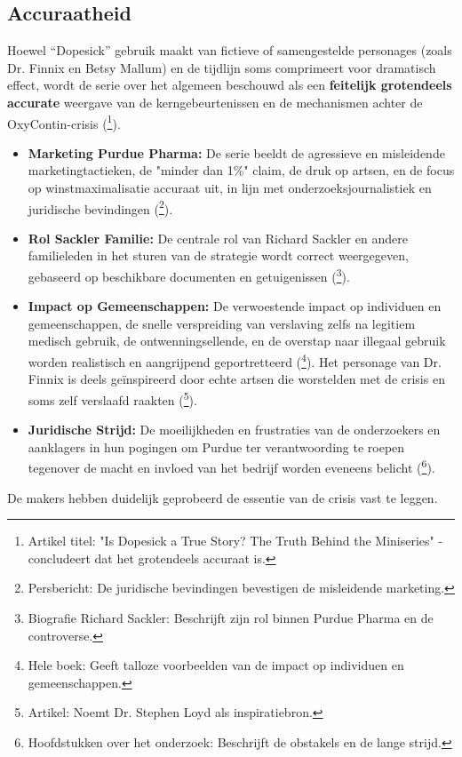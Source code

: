 \documentclass[11pt, a4paper]{report} %
\begin{document}
\subsection{Accuraatheid}
Hoewel \enquote{Dopesick} gebruik maakt van fictieve of samengestelde personages (zoals Dr. Finnix en Betsy Mallum) en de tijdlijn soms comprimeert voor dramatisch effect, wordt de serie over het algemeen beschouwd als een \textbf{feitelijk grotendeels accurate} weergave van de kerngebeurtenissen en de mechanismen achter de OxyContin-crisis (\cite{AvenuesRecoveryDopesickTrue}\footnote{Artikel titel: "Is Dopesick a True Story? The Truth Behind the Miniseries" - concludeert dat het grotendeels accuraat is.}).
\begin{itemize}
    \item \textbf{Marketing Purdue Pharma:} De serie beeldt de agressieve en misleidende marketingtactieken, de "minder dan 1\%" claim, de druk op artsen, en de focus op winstmaximalisatie accuraat uit, in lijn met onderzoeksjournalistiek en juridische bevindingen (\cite{JusticeDeptPurdueResolution}\footnote{Persbericht: De juridische bevindingen bevestigen de misleidende marketing.}).
    \item \textbf{Rol Sackler Familie:} De centrale rol van Richard Sackler en andere familieleden in het sturen van de strategie wordt correct weergegeven, gebaseerd op beschikbare documenten en getuigenissen (\cite{WikipediaRichardSackler}\footnote{Biografie Richard Sackler: Beschrijft zijn rol binnen Purdue Pharma en de controverse.}).
    \item \textbf{Impact op Gemeenschappen:} De verwoestende impact op individuen en gemeenschappen, de snelle verspreiding van verslaving zelfs na legitiem medisch gebruik, de ontwenningsellende, en de overstap naar illegaal gebruik worden realistisch en aangrijpend geportretteerd (\cite{Macy2018Dopesick}\footnote{Hele boek: Geeft talloze voorbeelden van de impact op individuen en gemeenschappen.}). Het personage van Dr. Finnix is deels geïnspireerd door echte artsen die worstelden met de crisis en soms zelf verslaafd raakten (\cite{HealthlineDopesickTruth}\footnote{Artikel: Noemt Dr. Stephen Loyd als inspiratiebron.}).
    \item \textbf{Juridische Strijd:} De moeilijkheden en frustraties van de onderzoekers en aanklagers in hun pogingen om Purdue ter verantwoording te roepen tegenover de macht en invloed van het bedrijf worden eveneens belicht (\cite{Macy2018Dopesick}\footnote{Hoofdstukken over het onderzoek: Beschrijft de obstakels en de lange strijd.}).
\end{itemize}
De makers hebben duidelijk geprobeerd de essentie van de crisis vast te leggen.
\end{document}
